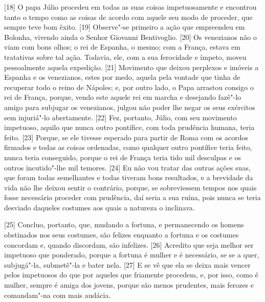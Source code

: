 {[}18{]} O papa Júlio  procedeu em todas as suas coisas impetuosamente
e encontrou tanto o tempo como as coisas de acordo com aquele seu modo
de proceder, que sempre teve bom êxito. {[}19{]} Observe"-se primeiro a
ação que empreendeu em Bolonha, vivendo ainda o Senhor Giovanni Bentivoglio.
{[}20{]} Os venezianos não o viam com bons olhos; o rei de Espanha, o
mesmo; com a França, estava em tratativas sobre tal ação. Todavia, ele,
com a sua ferocidade e ímpeto, moveu pessoalmente aquela expedição.
{[}21{]} Movimento que deixou perplexos e imóveis a Espanha e os
venezianos, estes por medo, aquela pela vontade que tinha de recuperar
todo o reino de Nápoles; e, por outro lado, o Papa arrastou consigo o
rei de França, porque, vendo este aquele rei em marcha e desejando
fazê"-lo amigo para subjugar os venezianos, julgou não poder lhe negar os
seus exércitos sem injuriá"-lo abertamente. {[}22{]} Fez, portanto,
Júlio, com seu movimento impetuoso, aquilo que nunca outro pontífice,
com toda prudência humana, teria feito. {[}23{]} Porque, se ele tivesse
esperado para partir de Roma com os acordos firmados e todas as coisas
ordenadas, como qualquer outro pontífice teria feito, nunca teria
conseguido, porque o rei de França teria tido mil desculpas e os outros
incutido"-lhe mil temores. {[}24{]} Eu não vou tratar das outras ações
suas, que foram todas semelhantes e todas tiveram bons resultados, e a
brevidade da vida não lhe deixou sentir o contrário, porque, se
sobreviessem tempos nos quais fosse necessário proceder com prudência,
daí seria a sua ruína, pois nunca se teria desviado daqueles costumes
aos quais a natureza o inclinava.

{[}25{]} Concluo, portanto, que, mudando a fortuna, e permanecendo os
homens obstinados nos seus costumes, são felizes enquanto a fortuna e os
costumes concordam e, quando discordam, são infelizes. {[}26{]} Acredito
que seja melhor ser impetuoso que ponderado, porque a fortuna é mulher e
é necessário, se se a quer, subjugá"-la, submetê"-la e bater
nela. {[}27{]} E se vê que ela se deixa mais vencer pelos
impetuosos do que por aqueles que friamente procedem, e, por isso, como
é mulher, sempre é amiga dos jovens, porque são menos prudentes, mais
ferozes e comandam"-na com mais audácia.

